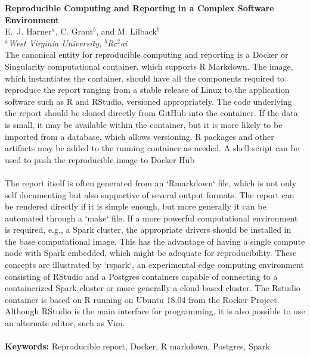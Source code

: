
\setlength{\textwidth}{160mm}\setlength{\textheight}{240mm}
\setlength{\oddsidemargin}{0mm}\setlength{\evensidemargin}{0mm}
\setlength{\topmargin}{-10mm}
\setlength{\parindent}{0mm} 
\pagestyle{empty}	%



{\Large\bf Reproducible Computing and Reporting in a Complex Software Environment}\\[4mm]

E.~J. Harner$^a$, C. Grant$^b$, and  M. Lilback$^b$\\ 				

{\small \em $^a$West Virginia University, $^b$Rc$^2$ai}\\[3mm]

The canonical entity for reproducible computing and reporting is a Docker or Singularity computational container, which supports R Markdown. The image, which instantiates the container, should have all the components required to reproduce the report ranging from a stable release of Linux to the application software such as R and RStudio, versioned appropriately. The code underlying the report should be cloned directly from GitHub into the container. If the data is small,  it may be available within the container, but it is more likely to be imported from a database, which allows versioning. R packages and other artifacts may be added to the running container as needed. A shell script can be used to push the reproducible image to Docker Hub
\\
\\
The report itself is often generated from an `Rmarkdown` file, which is not only self documenting but also supportive of several output formats. The report can be rendered directly if it is simple enough, but more generally it can be automated through a `make` file. If a more powerful computational environment is required, e.g., a Spark cluster, the appropriate drivers should be installed in the base computational image. This has the advantage of having a single compute node with Spark embedded, which might be adequate for reproducibility. These concepts are illustrated by `rspark`, an experimental edge computing environment consisting of RStudio and a Postgres containers capable of connecting to a containerized Spark cluster or more generally a cloud-based cluster. The Rstudio container is based on R running on Ubuntu 18.04 from the Rocker Project. Although RStudio is the main interface for programming, it is also possible to use an alternate editor, such as Vim.
\\
\\
\textbf{Keywords:} Reproducible report, Docker, R markdown, Postgres, Spark


